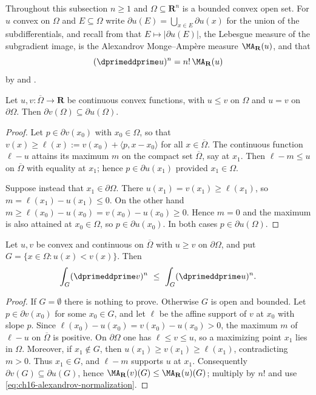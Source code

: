 Throughout this subsection $n\geq1$ and
$\Omega\subseteq\mathbf R^n$ is a bounded convex open set.  For $u$ convex on $\Omega$ and $E\subseteq\Omega$ write
$\partial u(E)=\bigcup_{x\in E}\partial u(x)$ for the union of the
subdifferentials, and recall from  that
$E\mapsto|\partial u(E)|$, the Lebesgue measure of the subgradient image, is
the Alexandrov Monge--Amp\`ere measure $\MA_{\mathbf R}(u)$, and that
\begin{equation}
\label{eq:ch16-alexandrov-normalization}
 (\dprimeddprime u)^n=n!\,\MA_{\mathbf R}(u)
\end{equation}
by  and
.

\begin{lemma}
\label{lem:ch16-subgradient-inclusion}
Let $u,v:\overline\Omega\to\mathbf R$ be continuous convex functions, with
$u\leq v$ on $\Omega$ and $u=v$ on $\partial\Omega$.  Then
$\partial v(\Omega)\subseteq\partial u(\Omega)$.
\end{lemma}

\begin{proof}
Let $p\in\partial v(x_0)$ with $x_0\in\Omega$, so that
$v(x)\geq\ell(x):=v(x_0)+\langle p,x-x_0\rangle$ for all
$x\in\overline\Omega$.  The continuous function $\ell-u$ attains its maximum
$m$ on the compact set $\overline\Omega$, say at $x_1$.  Then
$\ell-m\leq u$ on $\overline\Omega$ with equality at $x_1$; hence
$p\in\partial u(x_1)$ provided $x_1\in\Omega$.

Suppose instead that $x_1\in\partial\Omega$.  There
$u(x_1)=v(x_1)\geq\ell(x_1)$, so $m=\ell(x_1)-u(x_1)\leq0$.  On the other
hand $m\geq\ell(x_0)-u(x_0)=v(x_0)-u(x_0)\geq0$.  Hence $m=0$ and the
maximum is also attained at $x_0\in\Omega$, so $p\in\partial u(x_0)$.  In
both cases $p\in\partial u(\Omega)$.
\end{proof}

\begin{theorem}
\label{thm:ch16-comparison-chart}
Let $u,v$ be convex and continuous on $\overline\Omega$ with $u\geq v$ on
$\partial\Omega$, and put $G=\{x\in\Omega:u(x)<v(x)\}$.  Then
\[
 \int_G(\dprimeddprime v)^n\ \leq\ \int_G(\dprimeddprime u)^n .
\]
\end{theorem}

\begin{proof}
If $G=\emptyset$ there is nothing to prove.  Otherwise $G$ is open and
bounded.  Let $p\in\partial v(x_0)$ for some $x_0\in G$, and let $\ell$ be
the affine support of $v$ at $x_0$ with slope $p$.  Since
$\ell(x_0)-u(x_0)=v(x_0)-u(x_0)>0$, the maximum $m$ of $\ell-u$ on
$\overline\Omega$ is positive.  On $\partial\Omega$ one has
$\ell\leq v\leq u$, so a maximizing point $x_1$ lies in $\Omega$.  Moreover,
if $x_1\notin G$, then $u(x_1)\geq v(x_1)\geq\ell(x_1)$, contradicting
$m>0$.  Thus $x_1\in G$, and $\ell-m$ supports $u$ at $x_1$.  Consequently
$\partial v(G)\subseteq\partial u(G)$, hence
$\MA_{\mathbf R}(v)(G)\leq\MA_{\mathbf R}(u)(G)$; multiply by $n!$ and use
\eqref{eq:ch16-alexandrov-normalization}.
\end{proof}

